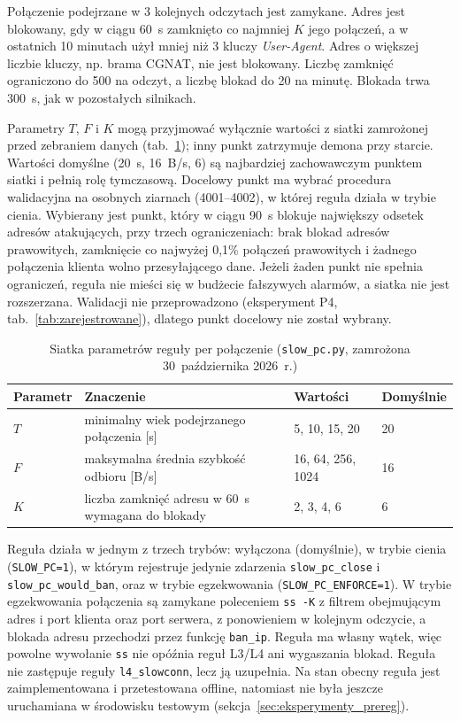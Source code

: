 \documentclass[a4paper,12pt]{article}
\begin{document}
Połączenie podejrzane w 3 kolejnych odczytach jest zamykane. Adres jest blokowany, gdy w ciągu 60~s zamknięto co najmniej $K$ jego połączeń, a w ostatnich 10 minutach użył mniej niż 3 kluczy \textit{User-Agent}. Adres o większej liczbie kluczy, np. brama CGNAT, nie jest blokowany. Liczbę zamknięć ograniczono do 500 na odczyt, a liczbę blokad do 20 na minutę. Blokada trwa 300~s, jak w pozostałych silnikach.

Parametry $T$, $F$ i $K$ mogą przyjmować wyłącznie wartości z siatki zamrożonej przed zebraniem danych (tab.~\ref{tab:slowpc_siatka}); inny punkt zatrzymuje demona przy starcie. Wartości domyślne (20~s, 16~B/s, 6) są najbardziej zachowawczym punktem siatki i pełnią rolę tymczasową. Docelowy punkt ma wybrać procedura walidacyjna na osobnych ziarnach (4001--4002), w której reguła działa w trybie cienia. Wybierany jest punkt, który w ciągu 90~s blokuje największy odsetek adresów atakujących, przy trzech ograniczeniach: brak blokad adresów prawowitych, zamknięcie co najwyżej 0,1\% połączeń prawowitych i żadnego połączenia klienta wolno przesyłającego dane. Jeżeli żaden punkt nie spełnia ograniczeń, reguła nie mieści się w budżecie fałszywych alarmów, a siatka nie jest rozszerzana. Walidacji nie przeprowadzono (eksperyment P4, tab.~\ref{tab:zarejestrowane}), dlatego punkt docelowy nie został wybrany.

\begin{table}[H]
\centering
\small
\caption{Siatka parametrów reguły per połączenie (\texttt{slow\_pc.py}, zamrożona 30~października 2026~r.)}\label{tab:slowpc_siatka}
\begin{tabular}{@{}llll@{}}
\toprule
Parametr & Znaczenie & Wartości & Domyślnie \\
\midrule
$T$ & minimalny wiek podejrzanego połączenia [s] & 5, 10, 15, 20 & 20 \\
$F$ & maksymalna średnia szybkość odbioru [B/s] & 16, 64, 256, 1024 & 16 \\
$K$ & liczba zamknięć adresu w 60~s wymagana do blokady & 2, 3, 4, 6 & 6 \\
\bottomrule
\end{tabular}
\end{table}

Reguła działa w jednym z trzech trybów: wyłączona (domyślnie), w trybie cienia (\texttt{SLOW\_PC=1}), w którym rejestruje jedynie zdarzenia \texttt{slow\_pc\_close} i \texttt{slow\_pc\_would\_ban}, oraz w trybie egzekwowania (\texttt{SLOW\_PC\_ENFORCE=1}). W trybie egzekwowania połączenia są zamykane poleceniem \texttt{ss -K} z filtrem obejmującym adres i port klienta oraz port serwera, z ponowieniem w kolejnym odczycie, a blokada adresu przechodzi przez funkcję \texttt{ban\_ip}. Reguła ma własny wątek, więc powolne wywołanie \texttt{ss} nie opóźnia reguł L3/L4 ani wygaszania blokad. Reguła nie zastępuje reguły \texttt{l4\_slowconn}, lecz ją uzupełnia. Na stan obecny reguła jest zaimplementowana i przetestowana offline, natomiast nie była jeszcze uruchamiana w środowisku testowym (sekcja~\ref{sec:eksperymenty_prereg}).
\end{document}
